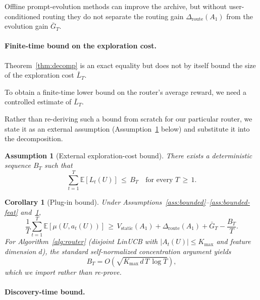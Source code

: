 \documentclass{article} %
\newtheorem{corollary}[theorem]{Corollary}
\newtheorem{assumption}{Assumption}
\providecommand{\E}{\mathbb{E}}
\begin{document}
Offline prompt-evolution methods can improve the archive, but without user-conditioned routing they do not separate the routing gain $\Delta_{\mathrm{route}}(A_1)$ from the evolution gain $\bar G_T$.

\paragraph{Finite-time bound on the exploration cost.}

\label{sec:method-plugin}

Theorem~\ref{thm:decomp} is an exact equality but does not by itself bound the size of the exploration cost $\bar L_T$.

To obtain a finite-time lower bound on the router's average reward, we need a controlled estimate of $\bar L_T$.

Rather than re-deriving such a bound from scratch for our particular router, we state it as an external assumption (Assumption~\ref{ass:Bt} below) and substitute it into the decomposition.

\begin{assumption}[External exploration-cost bound]
\label{ass:Bt}
There exists a deterministic sequence $B_T$ such that
\begin{equation}
\label{eq:ass-Bt}
\sum_{t=1}^T \E[L_t(U)] \,\le\, B_T \quad \text{for every } T \,\ge\, 1.
\end{equation}
\end{assumption}

\begin{corollary}[Plug-in bound]
\label{cor:plugin}
Under Assumptions~\ref{ass:bounded}--\ref{ass:bounded-feat} and~\ref{ass:Bt},
\begin{equation}
\label{eq:cor-plugin}
\frac{1}{T}\sum_{t=1}^T \E[\mu(U, a_t(U))]
\,\ge\, V_{\mathrm{static}}(A_1) + \Delta_{\mathrm{route}}(A_1) + \bar G_T - \frac{B_T}{T}.
\end{equation}
For Algorithm~\ref{alg:router} (disjoint LinUCB with $|A_t(U)| \le K_{\max}$ and feature dimension $d$), the standard self-normalized concentration argument \citep{abbasi2011oful,chu2011linucb} yields
\begin{equation}
\label{eq:cor-plugin-rate}
B_T = O\!\left(\sqrt{K_{\max} \, d \, T \, \log T}\right),
\end{equation}
which we import rather than re-prove.
\end{corollary}

\paragraph{Discovery-time bound.}
\end{document}
